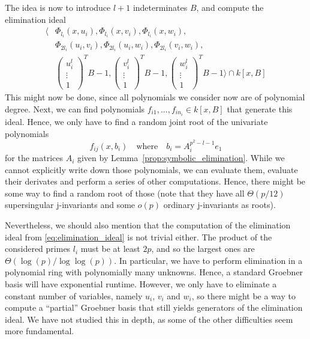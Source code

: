 The idea is now to introduce $l + 1$ indeterminates $B$, and compute the elimination ideal
\begin{equation}
\label{eq:elimination_ideal}
\begin{split}
    \langle &\Phi_{l_i}(x, u_i), \Phi_{l_i}(x, v_i), \Phi_{l_i}(x, w_i), \\
    &\Phi_{2l_i}(u_i, v_i), \Phi_{2l_i}(u_i, w_i), \Phi_{2l_i}(v_i, w_i), \\
    &\left(\begin{matrix*}
        u_i^l \\
        \vdots \\
        1
    \end{matrix*}\right)^T B - 1, \left(\begin{matrix*}
        v_i^l \\
        \vdots \\
        1
    \end{matrix*}\right)^T B - 1, \left(\begin{matrix*}
        w_i^l \\
        \vdots \\
        1
    \end{matrix*}\right)^T B - 1 \rangle \cap k[x, B]
\end{split}
\end{equation}
This might now be done, since all polynomials we consider now are of polynomial degree.
Next, we can find polynomials $f_{i1}, ..., f_{in_i} \in k[x, B]$ that generate this ideal.
Hence, we only have to find a random joint root of the univariate polynomials
\begin{equation*}
    f_{i j}(x, b_i) \quad \text{where} \quad b_i = A_i^{p^2 - l - 1} e_1
\end{equation*}
for the matrices $A_i$ given by Lemma~\ref{prop:symbolic_elimination}.
While we cannot explicitly write down those polynomials, we can evaluate them, evaluate their derivates and perform a series of other computations.
Hence, there might be some way to find a random root of those (note that they have all $\Theta(p/12)$ supersingular j-invariants and some $o(p)$ ordinary j-invariants as roots).

Nevertheless, we should also mention that the computation of the elimination ideal from \ref{eq:elimination_ideal} is not trivial either.
The product of the considered primes $l_i$ must be at least $2p$, and so the largest ones are $\Theta(\log(p)/\log\log(p))$.
In particular, we have to perform elimination in a polynomial ring with polynomially many unknowns.
Hence, a standard Groebner basis will have exponential runtime.
However, we only have to eliminate a constant number of variables, namely $u_i$, $v_i$ and $w_i$, so there might be a way to compute a ``partial'' Groebner basis that still yields generators of the elimination ideal.
We have not studied this in depth, as some of the other difficulties seem more fundamental.

